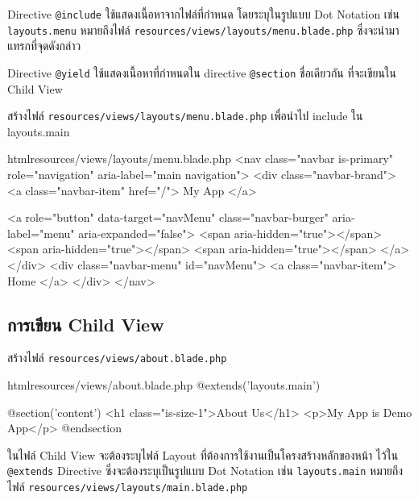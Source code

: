 Directive \texttt{@include} ใช้แสดงเนื้อหาจากไฟล์ที่กำหนด 
โดยระบุในรูปแบบ Dot Notation เช่น \texttt{layouts.menu} หมายถึงไฟล์ \texttt{resources/views/layouts/menu.blade.php} ซึ่งจะนำมาแทรกที่จุดดังกล่าว

Directive \texttt{@yield} ใช้แสดงเนื้อหาที่กำหนดใน directive \texttt{@section} ชื่อเดียวกัน ที่จะเขียนใน Child View

\newpage

สร้างไฟล์ \texttt{resources/views/layouts/menu.blade.php} เพื่อนำไป include ใน layouts.main

\begin{code}{html}{resources/views/layouts/menu.blade.php}{}
    <nav class="navbar is-primary" 
         role="navigation" aria-label="main navigation">
        <div class="navbar-brand">
            <a class="navbar-item" href="/">
                My App
            </a>

            <a role="button" data-target="navMenu" class="navbar-burger" 
               aria-label="menu" aria-expanded="false">
                <span aria-hidden="true"></span>
                <span aria-hidden="true"></span>
                <span aria-hidden="true"></span>
            </a>
        </div>
        <div class="navbar-menu" id="navMenu">
            <a class="navbar-item">
                Home
            </a>
        </div>
    </nav>


\end{code}

\subsection{การเขียน Child View}

สร้างไฟล์ \texttt{resources/views/about.blade.php}

\begin{code}{html}{resources/views/about.blade.php}{}
    @extends('layouts.main')

    @section('content')
        <h1 class="is-size-1">About Us</h1>
        <p>My App is Demo App</p>
    @endsection

\end{code}

ในไฟล์ Child View จะต้องระบุไฟล์ Layout ที่ต้องการใช้งานเป็นโครงสร้างหลักของหน้า 
ไว้ใน \texttt{@extends} Directive ซึ่งจะต้องระบุเป็นรูปแบบ Dot Notation 
เช่น \texttt{layouts.main} หมายถึงไฟล์ \texttt{resources/views/layouts/main.blade.php}

